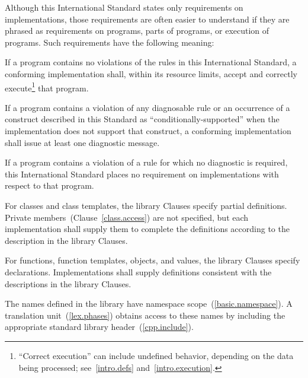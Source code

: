 \pnum
{}%
Although this International Standard states only requirements on \Cpp
implementations, those requirements are often easier to understand if
they are phrased as requirements on programs, parts of programs, or
execution of programs. Such requirements have the following meaning:
\begin{compactitem}

\item
If a program contains no violations of the rules in this
International Standard, a conforming implementation shall,
within its resource limits, accept and correctly execute\footnote{``Correct execution'' can include undefined behavior, depending on
the data being processed; see~\ref{intro.defs} and~\ref{intro.execution}.}
that program.

\item
{}%
If a program contains a violation of any diagnosable rule or an occurrence
of a construct described in this Standard as ``conditionally-supported'' when
the implementation does not support that construct, a conforming implementation
shall issue at least one diagnostic message.

\item
{}%
If a program contains a violation of a rule for which no diagnostic
is required, this International Standard places no requirement on
implementations with respect to that program.

\end{compactitem}

\pnum
{}%
%
%
For classes and class templates, the library Clauses specify partial
definitions. Private members~(Clause~\ref{class.access}) are not
specified, but each implementation shall supply them to complete the
definitions according to the description in the library Clauses.

\pnum
For functions, function templates, objects, and values, the library
Clauses specify declarations. Implementations shall supply definitions
consistent with the descriptions in the library Clauses.

\pnum
The names defined in the library have namespace
scope~(\ref{basic.namespace}). A \Cpp  translation
unit~(\ref{lex.phases}) obtains access to these names by including the
appropriate standard library header~(\ref{cpp.include}).

